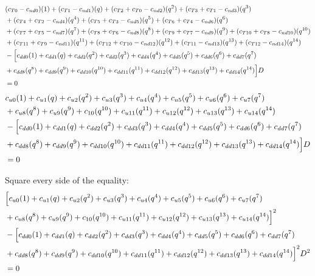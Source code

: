 \documentclass[12pt]{article}
\begin{document}
\begin{align}
    &  (c_{T0}-c_{nd0})(1) + (c_{T1}-c_{nd1})(q) + (c_{T2}+ c_{T0}-c_{nd2})(q^2) + (c_{T3}+c_{T1}-c_{nd3})(q^3) \nonumber\\
    &+ (c_{T4}+c_{T2}-c_{nd4})(q^4) + (c_{T5}+c_{T3}-c_{nd5})(q^5) + (c_{T6}+c_{T4}-c_{nd6})(q^6) \nonumber\\
    &+ (c_{T7}+c_{T5}-c_{nd7})(q^7) + (c_{T8}+c_{T6}-c_{nd8})(q^8) + (c_{T9}+c_{T7}-c_{nd9})(q^9) + (c_{T10}+c_{T8}-c_{nd10})(q^{10}) \nonumber\\
    &+ (c_{T11}+c_{T9}-c_{nd11})(q^{11}) + (c_{T12}+c_{T10}-c_{nd12})(q^{12}) + (c_{T11}-c_{nd13})(q^{13}) + (c_{T12}-c_{nd14})(q^{14}) \nonumber\\
    &- \Bigl[  c_{dd0}(1) + c_{dd1}(q) + c_{dd2}(q^2) + c_{dd3}(q^3) + c_{dd4}(q^4) + c_{dd5}(q^5) + c_{dd6}(q^6) + c_{dd7}(q^7) \nonumber\\
    &+ c_{dd8}(q^8) + c_{dd9}(q^9) + c_{dd10}(q^{10}) + c_{dd11}(q^{11}) + c_{dd12}(q^{12}) + c_{dd13}(q^{13}) + c_{dd14}(q^{14}) \Bigr]D   \nonumber\\
    &= 0
\end{align}
\begin{align}
    &  c_{u0}(1) + c_{u1}(q) + c_{u2}(q^2) + c_{u3}(q^3) + c_{u4}(q^4) + c_{u5}(q^5) + c_{u6}(q^6) + c_{u7}(q^7) \nonumber\\
    &+ c_{u8}(q^8) + c_{u9}(q^9) + c_{10}(q^{10}) + c_{u11}(q^{11}) + c_{u12}(q^{12}) + c_{u13}(q^{13}) + c_{u14}(q^{14}) \nonumber\\
    &- \Bigl[  c_{dd0}(1) + c_{dd1}(q) + c_{dd2}(q^2) + c_{dd3}(q^3) + c_{dd4}(q^4) + c_{dd5}(q^5) + c_{dd6}(q^6) + c_{dd7}(q^7) \nonumber\\
    &+ c_{dd8}(q^8) + c_{dd9}(q^9) + c_{dd10}(q^{10}) + c_{dd11}(q^{11}) + c_{dd12}(q^{12}) + c_{dd13}(q^{13}) + c_{dd14}(q^{14}) \Bigr]D   \nonumber\\
    &= 0
\end{align}

Square every side of the equality:
\begin{align}
    &\Bigl[  c_{u0}(1) + c_{u1}(q) + c_{u2}(q^2) + c_{u3}(q^3) + c_{u4}(q^4) + c_{u5}(q^5) + c_{u6}(q^6) + c_{u7}(q^7) \nonumber\\
    &+ c_{u8}(q^8) + c_{u9}(q^9) + c_{10}(q^{10}) + c_{u11}(q^{11}) + c_{u12}(q^{12}) + c_{u13}(q^{13}) + c_{u14}(q^{14}) \Bigr]^2 \nonumber\\
    &- \Bigl[  c_{dd0}(1) + c_{dd1}(q) + c_{dd2}(q^2) + c_{dd3}(q^3) + c_{dd4}(q^4) + c_{dd5}(q^5) + c_{dd6}(q^6) + c_{dd7}(q^7) \nonumber\\
    &+ c_{dd8}(q^8) + c_{dd9}(q^9) + c_{dd10}(q^{10}) + c_{dd11}(q^{11}) + c_{dd12}(q^{12}) + c_{dd13}(q^{13}) + c_{dd14}(q^{14}) \Bigr]^2D^2  \nonumber\\
    &= 0
\end{align}
\end{document}
